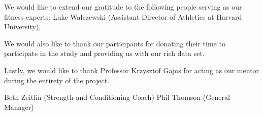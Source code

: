 We would like to extend our gratitude to the following people serving as our fitness experts: Luke Walczewski (Assistant Director of Athletics at Harvard University), 

We would also like to thank our participants for donating their time to participate in the study and providing us with our rich data set.

Lastly, we would like to thank Professor Krzysztof Gajos for acting as our mentor during the entirety of the project.



Beth Zeitlin (Strength and Conditioning Coach)
Phil Thomson (General Manager)
